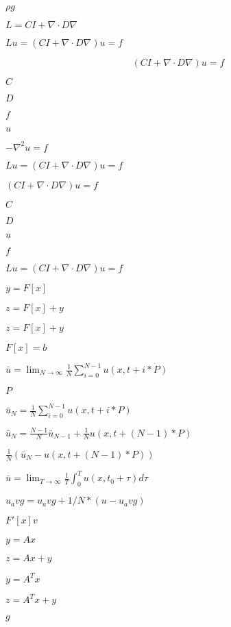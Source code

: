 \documentclass{article}
\begin{document}
{$ \rho g $
\pagebreak

$ L = C I + \nabla
\cdot D \nabla$
\pagebreak

$ \mbox{$L u$} = \mbox{$(C I + \nabla \cdot D \nabla) u$} = f $
\pagebreak

\[ (C I + \nabla \cdot D
  \nabla) u = f \]
\pagebreak

$ C $
\pagebreak

$ D $
\pagebreak

$ f $
\pagebreak

$ u $
\pagebreak

$
  -\nabla^2 u = f $
\pagebreak

$ \mbox{$L u$} = \mbox{$(C I + \nabla \cdot
  D \nabla) u$} = f $
\pagebreak

$ (C I + \nabla \cdot D \nabla ) u = f $
\pagebreak

$C$
\pagebreak

$D$
\pagebreak

$u$
\pagebreak

$f$
\pagebreak

$ \mbox{$L u$} = \mbox{$(C I +
  \nabla \cdot D \nabla) u$} = f $
\pagebreak

$ y=F[x] $
\pagebreak

$ z=F[x]+y
$
\pagebreak

$z=F[x]+y$
\pagebreak

$F[x]=b$
\pagebreak

$ \bar{u} = \lim_{N\rightarrow\infty}\frac{1}{N} \sum_{i = 0}^{N-1} u(x,t + i*P)
$
\pagebreak

$ P $
\pagebreak

$ \bar{u}_N = \frac{1}{N} \sum_{i = 0}^{N-1}
u(x,t + i*P) $
\pagebreak

$ \bar{u}_N = \frac{N - 1}{N} \bar{u}_{N-1} + \frac{1}{N} u(x, t + (N-1)*P) $
\pagebreak

$ \frac{1}{N} (\bar{u}_N - u(x, t + (N-1)*P)) $
\pagebreak

$ \bar{u} = \lim_{T\rightarrow\infty}
\frac{1}{T} \int_0^T u(x, t_0 + \tau)d\tau $
\pagebreak

$ u_avg = u_avg + 1/N * (u - u_avg) $
\pagebreak

$ F'[x]v $
\pagebreak

$ y=Ax $
\pagebreak

$ z=Ax+y $
\pagebreak

$ y=A^{T} x $
\pagebreak

$ z=A^{T}x+y $
\pagebreak

$g$
\pagebreak

}
\end{document}
